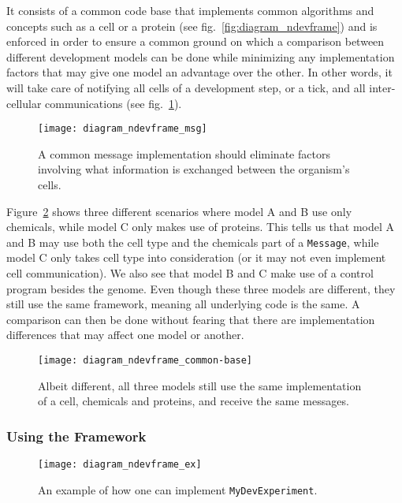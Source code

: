 It consists of a common code base that implements common algorithms and concepts such as a cell or a protein (see fig.~\ref{fig:diagram_ndevframe}) and is enforced in order to ensure a common ground on which a comparison between different development models can be done while minimizing any implementation factors that may give one model an advantage over the other. In other words, it will take care of notifying all cells of a development step, or a tick, and all inter-cellular communications (see fig.~\ref{fig:diagram_ndevframe_msg}).

\begin{figure}[!ht]
	\centering
	\texttt{[image: diagram\_ndevframe\_msg]}
	\caption{A common message implementation should eliminate factors involving what information is exchanged between the organism's cells.}
	\label{fig:diagram_ndevframe_msg}
\end{figure}

Figure~\ref{fig:diagram_ndevframe_common-base} shows three different scenarios where model A and B use only chemicals, while model C only makes use of proteins. This tells us that model A and B may use both the cell type and the chemicals part of a \texttt{Message}, while model C only takes cell type into consideration (or it may not even implement cell communication). We also see that model B and C make use of a control program besides the genome. Even though these three models are different, they still use the same framework, meaning all underlying code is the same. A comparison can then be done without fearing that there are implementation differences that may affect one model or another.

\begin{figure}[!ht]
	\centering
	\texttt{[image: diagram\_ndevframe\_common-base]}
	\caption{Albeit different, all three models still use the same implementation of a cell, chemicals and proteins, and receive the same messages.}
	\label{fig:diagram_ndevframe_common-base}
\end{figure}


\subsubsection{Using the Framework}
\begin{figure}[!ht]
	\centering
	\texttt{[image: diagram\_ndevframe\_ex]}
	\caption{An example of how one can implement \texttt{MyDevExperiment}.}
	\label{fig:diagram_ndevframe_ex}
\end{figure}

